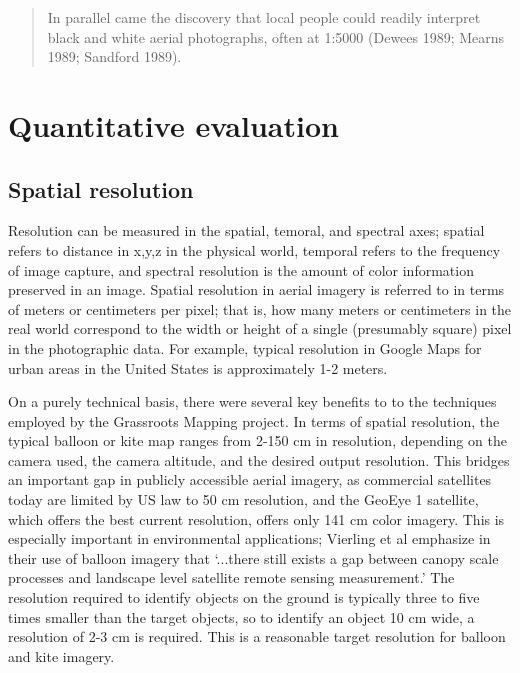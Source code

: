 \documentclass[11pt]{report}
\begin{document}
\begin{quote}
In parallel came the discovery that local people could readily interpret black and white aerial photographs, often at 1:5000 (Dewees 1989; Mearns 1989; Sandford 1989). 
\cite{chambers2006participatory}
\end{quote}


\section{Quantitative evaluation}


\subsection{Spatial resolution}

Resolution can be measured in the spatial, temoral, and spectral axes; spatial refers to distance in x,y,z in the physical world, temporal refers to the frequency of image capture, and spectral resolution is the amount of color information preserved in an image. Spatial resolution in aerial imagery is referred to in terms of meters or centimeters per pixel; that is, how many meters or centimeters in the real world correspond to the width or height of a single (presumably square) pixel in the photographic data. For example, typical resolution in Google Maps for urban areas in the United States is approximately 1-2 meters. 
 
On a purely technical basis, there were several key benefits to to the techniques employed by the Grassroots Mapping project. In terms of spatial resolution, the typical balloon or kite map ranges from 2-150 cm in resolution, depending on the camera used, the camera altitude, and the desired output resolution. This bridges an important gap in publicly accessible aerial imagery, as commercial satellites today are limited by US law to 50 cm resolution, and the GeoEye 1 satellite, which offers the best current resolution, offers only 141 cm color imagery. This is especially important in environmental applications; Vierling et al emphasize in their use of balloon imagery that `...there still exists a gap between canopy scale processes and landscape level satellite remote sensing measurement.' \cite{vierling2006short} The resolution required to identify objects on the ground is typically three to five times smaller than the target objects, so to identify an object 10 cm wide, a resolution of 2-3 cm is required. \cite{aber2002unmanned} This is a reasonable target resolution for balloon and kite imagery. 
\end{document}
